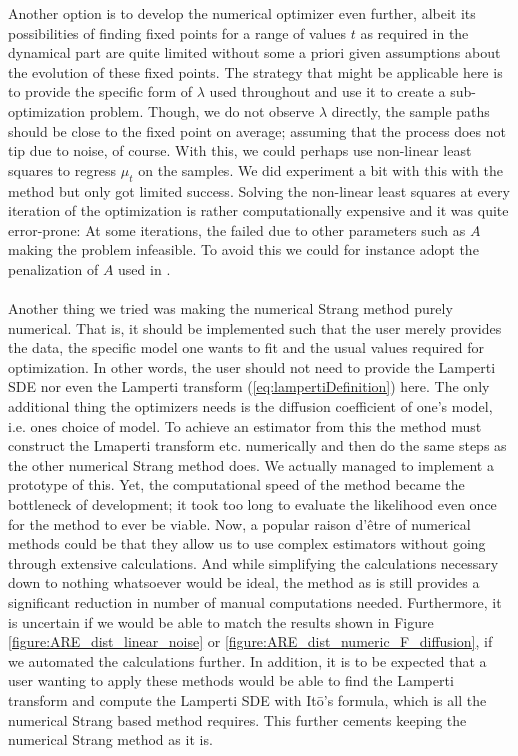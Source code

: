 Another option is to develop the numerical optimizer even further, albeit its possibilities of finding fixed points for a range of values $t$ as required in the dynamical part are quite limited without some a priori given assumptions about the evolution of these fixed points. The strategy that might be applicable here is to provide the specific form of $\lambda$ used throughout and use it to create a sub-optimization problem. Though, we do not observe $\lambda$ directly, the sample paths should be close to the fixed point on average; assuming that the process does not tip due to noise, of course. With this, we could perhaps use non-linear least squares to regress $\mu_t$ on the samples. We did experiment a bit with this with the method  but only got limited success. Solving the non-linear least squares at every iteration of the optimization is rather computationally expensive and it was quite error-prone: At some iterations, the  failed due to other parameters such as $A$ making the problem infeasible. To avoid this we could for instance adopt the penalization of $A$ used in \cite{Ditlevsen2023}.\\\\
Another thing we tried was making the numerical Strang method purely numerical. That is, it should be implemented such that the user merely provides the data, the specific model one wants to fit and the usual values required for optimization. In other words, the user should not need to provide the Lamperti SDE nor even the Lamperti transform (\ref{eq:lampertiDefinition}) here. The only additional thing the optimizers needs is the diffusion coefficient of one's model, i.e. ones choice of model. To achieve an estimator from this the method must construct the Lmaperti transform etc. numerically and then do the same steps as the other numerical Strang method does. We actually managed to implement a prototype of this. Yet, the computational speed of the method became the bottleneck of development; it took too long to evaluate the likelihood even once for the method to ever be viable. Now, a popular raison d'être of numerical methods could be that they allow us to use complex estimators without going through extensive calculations. And while simplifying the calculations necessary down to nothing whatsoever would be ideal, the method as is still provides a significant reduction in number of manual computations needed. Furthermore, it is uncertain if we would be able to match the results shown in Figure \ref{figure:ARE_dist_linear_noise} or \ref{figure:ARE_dist_numeric_F_diffusion}, if we automated the calculations further. In addition, it is to be expected that a user wanting to apply these methods would be able to find the Lamperti transform and compute the Lamperti SDE with Itō's formula, which is all the numerical Strang based method requires. This further cements keeping the numerical Strang method as it is.\\\\
